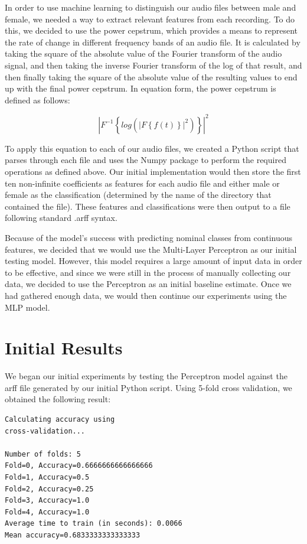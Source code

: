 \documentclass{article}
\begin{document}
In order to use machine learning to distinguish our audio files between male and female, we needed a way to extract relevant features from each recording.  To do this, we decided to use the power cepstrum, which provides a means to represent the rate of change in different frequency bands of an audio file.  It is calculated by taking the square of the absolute value of the Fourier transform of the audio signal, and then taking the inverse Fourier transform of the log of that result, and then finally taking the square of the absolute value of the resulting values to end up with the final power cepstrum.  In equation form, the power cepstrum is defined as follows:

$$
\left |{F}^{-1}\left \{log(\left |F\left \{f(t)\right \}\right |^2)\right \}  \right |^2 
$$

To apply this equation to each of our audio files, we created a Python script that parses through each file and uses the Numpy package to perform the required operations as defined above.  Our initial implementation would then store the first ten non-infinite coefficients as features for each audio file and either male or female as the classification (determined by the name of the directory that contained the file).  These features and classifications were then output to a file following standard .arff syntax.

Because of the model's success with predicting nominal classes from continuous features, we decided that we would use the Multi-Layer Perceptron as our initial testing model.  However, this model requires a large amount of input data in order to be effective, and since we were still in the process of manually collecting our data, we decided to use the Perceptron as an initial baseline estimate.  Once we had gathered enough data, we would then continue our experiments using the MLP model.

\section{Initial Results}

We began our initial experiments by testing the Perceptron model against the arff file generated by our initial Python script. Using 5-fold cross validation, we obtained the following result:

\begin{verbatim}
Calculating accuracy using
cross-validation...

Number of folds: 5
Fold=0, Accuracy=0.6666666666666666
Fold=1, Accuracy=0.5
Fold=2, Accuracy=0.25
Fold=3, Accuracy=1.0
Fold=4, Accuracy=1.0
Average time to train (in seconds): 0.0066
Mean accuracy=0.6833333333333333
\end{verbatim}
\end{document}
